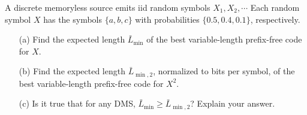 \documentclass{assignment}
\begin{document}
\begin{prob}[2.21]
    A discrete memoryless source emits iid random symbols $X_1,X_2,\cdots$ Each random symbol $X$ has the symbols $\{a,b,c\}$ with probabilities $\{0.5,0.4,0.1\}$, respectively.
    \begin{itemize}
        \item[(a)] Find the expected length $\bar{L}_{\min}$ of the best variable-length prefix-free code for $X$.
        \item[(b)] Find the expected length $\bar{L}_{\min,2}$, normalized to bits per symbol, of the best variable-length prefix-free code for $X^2$.
        \item[(c)] Is it true that for any DMS, $\bar{L}_{\min}\geq\bar{L}_{\min,2}$? Explain your answer.
    \end{itemize}
\end{prob}
\end{document}

